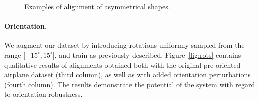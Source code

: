 \documentclass[acmtog,timestamp]{acmart}%
\begin{document}
\begin{figure}[h]
\begin{tabular}{c c c c}
\end{tabular}
    

    

    
    
\caption{Examples of alignment of asymmetrical shapes.}
\label{fig:asym}
\end{figure}\paragraph{\textbf{Orientation.}}%
We augment our dataset by introducing rotations uniformly sampled from the range 
$\lbrack -15^{\circ}, 15^{\circ}\rbrack$, and train \ourmethod{} as previously described. Figure~\ref{fig:rots} contains qualitative results of alignments obtained both with the original pre-oriented airplane dataset (third column), as well as with added orientation perturbations (fourth column). The results demonstrate the potential of the system with regard to orientation robustness.
\end{document}
